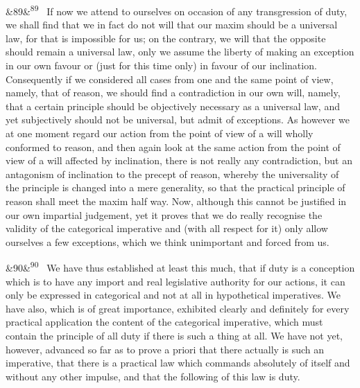 \documentclass[12pt]{article}
\newcommand{\para}[1][]{\par\noindent\ifx&#1&\else\textsuperscript{\footnotesize #1}~\fi}
\begin{document}
\para[89] If now we attend to ourselves on occasion of any transgression of duty, we shall find that we in fact do not will that our maxim should be a universal law, for that is impossible for us; on the contrary, we will that the opposite should remain a universal law, only we assume the liberty of making an exception in our own favour or (just for this time only) in favour of our inclination. Consequently if we considered all cases from one and the same point of view, namely, that of reason, we should find a contradiction in our own will, namely, that a certain principle should be objectively necessary as a universal law, and yet subjectively should not be universal, but admit of exceptions. As however we at one moment regard our action from the point of view of a will wholly conformed to reason, and then again look at the same action from the point of view of a will affected by inclination, there is not really any contradiction, but an antagonism of inclination to the precept of reason, whereby the universality of the principle is changed into a mere generality, so that the practical principle of reason shall meet the maxim half way. Now, although this cannot be justified in our own impartial judgement, yet it proves that we do really recognise the validity of the categorical imperative and (with all respect for it) only allow ourselves a few exceptions, which we think unimportant and forced from us.

\para[90] We have thus established at least this much, that if duty is a conception which is to have any import and real legislative authority for our actions, it can only be expressed in categorical and not at all in hypothetical imperatives. We have also, which is of great importance, exhibited clearly and definitely for every practical application the content of the categorical imperative, which must contain the principle of all duty if there is such a thing at all. We have not yet, however, advanced so far as to prove a priori that there actually is such an imperative, that there is a practical law which commands absolutely of itself and without any other impulse, and that the following of this law is duty.
\end{document}
